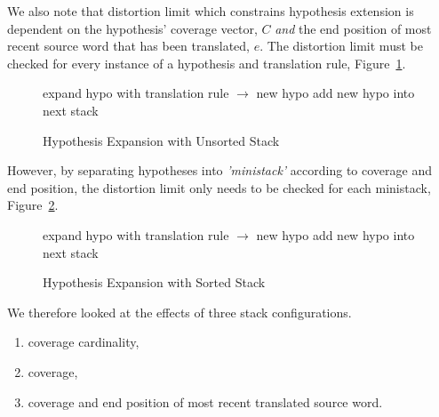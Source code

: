 \documentclass[11pt]{article}
\begin{document}
We also note that distortion limit which constrains hypothesis extension is dependent on the hypothesis' coverage vector, $C$ \emph{and} the end position of most recent source word that has been translated, $e$. The distortion limit must be checked for every instance of a hypothesis and translation rule, Figure~\ref{algo:Hypothesis Expansion with Unsorted Stack}.
\begin{figure} [h]
\begin{algorithmic}
	\STATE expand hypo with translation rule $\rightarrow$ new hypo
	\STATE add new hypo into next stack
      \ENDIF
  \ENDFOR %
\ENDFOR %
\end{algorithmic}
\caption{Hypothesis Expansion with Unsorted Stack}
\label{algo:Hypothesis Expansion with Unsorted Stack}
\end{figure}
However, by separating hypotheses into \emph{'ministack'} according to coverage and end position, the distortion limit only needs to be checked for each ministack, Figure~\ref{algo:Hypothesis Expansion with Sorted Stack}.
\begin{figure} [h]
\begin{algorithmic}
	\STATE expand hypo with translation rule $\rightarrow$ new hypo
	\STATE add new hypo into next stack
      \ENDFOR
    \ENDIF
  \ENDFOR %
\ENDFOR %
\end{algorithmic}
\caption{Hypothesis Expansion with Sorted Stack}
\label{algo:Hypothesis Expansion with Sorted Stack}
\end{figure}
We therefore looked at the effects of three stack configurations.
\begin{enumerate}
  \item coverage cardinality,
  \item coverage,
  \item coverage and end position of most recent translated source word.
\end{enumerate}
\end{document}
